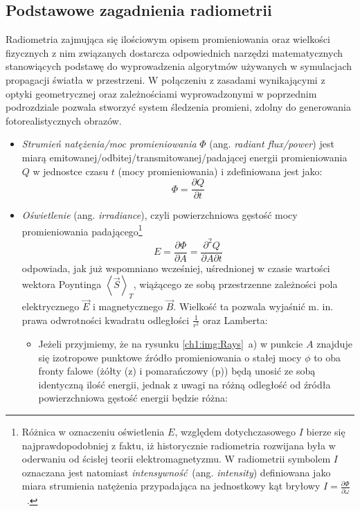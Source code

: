 \subsection{Podstawowe zagadnienia radiometrii}
Radiometria zajmująca się ilościowym opisem promieniowania oraz wielkości fizycznych z nim związanych dostarcza odpowiednich narzędzi matematycznych stanowiących podstawę do wyprowadzenia algorytmów używanych w symulacjach propagacji światła w przestrzeni. W połączeniu z zasadami wynikającymi z optyki geometrycznej oraz zależnościami wyprowadzonymi w poprzednim podrozdziale pozwala stworzyć system śledzenia promieni, zdolny do generowania fotorealistycznych obrazów. 

\begin{itemize}
\item \textit{Strumień natężenia/moc promieniowania} $\Phi$ (ang. \textit{radiant flux/power}) jest miarą emitowanej/odbitej/transmitowanej/padającej energii promieniowania $Q$ w  jednostce czasu $t$ (mocy promieniowania) i zdefiniowana jest jako:
\begin{equation}
\Phi = \frac{\partial Q}{\partial t}
\end{equation}
\item \textit{Oświetlenie} (ang. \textit{irradiance}), czyli powierzchniowa gęstość mocy promieniowania padającego\footnote{Różnica w oznaczeniu oświetlenia $E$, względem dotychczasowego $I$ bierze się najprawdopodobniej z faktu, iż historycznie radiometria rozwijana była w oderwaniu od ścisłej teorii elektromagnetyzmu. W radiometrii symbolem $I$ oznaczana jest natomiast \textit{intensywność}~(ang. \textit{intensity}) definiowana jako miara strumienia natężenia przypadająca na jednostkowy kąt bryłowy $I = \frac{\partial\Phi}{\partial\omega}$~\cite{PBRT}.}
\begin{equation}
E = \frac{\partial\Phi}{\partial A} = \frac{\partial^2 Q}{\partial A \partial t}
\end{equation}
odpowiada, jak już wspomniano wcześniej, uśrednionej w czasie wartości wektora Poyntinga $\left\langle \vec{S} \right\rangle_T$, wiążącego ze sobą przestrzenne zależności pola elektrycznego $\vec{E}$ i magnetycznego $\vec{B}$. Wielkość ta pozwala wyjaśnić m. in. prawa odwrotności kwadratu odległości $\frac{1}{r^2}$ oraz Lamberta:
\begin{itemize}
\item Jeżeli przyjmiemy, że na rysunku \ref{ch1:img:Rays}~a) w punkcie $A$ znajduje się izotropowe punktowe źródło promieniowania o stałej mocy $\phi$ to oba fronty falowe (żółty (z) i pomarańczowy (p)) będą unosić ze sobą identyczną ilość energii, jednak z uwagi na różną odległość od źródła powierzchniowa gęstość energii będzie różna:

\end{itemize}
\end{itemize}
